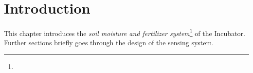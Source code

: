 \documentclass[../../main]{subfiles}
\begin{document}
\section{Introduction} \label{sec:}

This chapter introduces the \emph{soil moisture and fertilizer system}\footnote{} of the Incubator. Further
sections briefly goes through the design of the sensing system.

\end{document}
